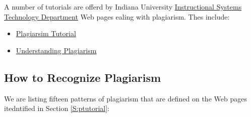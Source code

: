 A number of tutorials are offerd by Indiana University \href{http://education.indiana.edu/graduate/programs/instructional-systems/index.html}{Instructional
  Systems Technology Department}
 Web pages ealing with plagiarism. Thes include:

\begin{itemize}
\item
  \href{https://www.indiana.edu/~academy/firstPrinciples/choice.html}{Plagiarsim
    Tutorial}
\item
  \href{https://www.indiana.edu/~tedfrick/plagiarism/}{Understanding
  Plagiarism}
\end{itemize}

\subsection{How to Recognize Plagiarism}

We are listing fifteen patterns of plagiarism that are defined on the Web
pages itedntified in Section \ref{S:ptutorial}:

